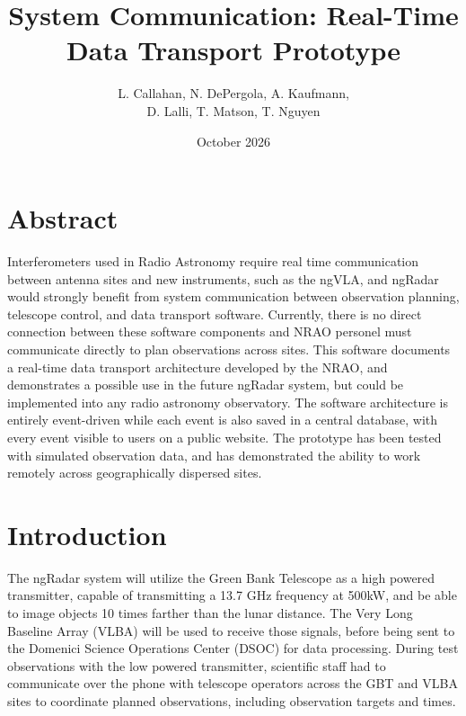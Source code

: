 \documentclass[12pt]{article}
\title{System Communication: Real-Time Data Transport Prototype}
\author{L. Callahan, N. DePergola, A. Kaufmann,\\D. Lalli, T. Matson, T. Nguyen}
\date{October 2026}
\begin{document}
\maketitle %


\section*{Abstract}

Interferometers used in Radio Astronomy require real time communication between antenna sites and new instruments, such as the ngVLA, and ngRadar would strongly benefit from system communication between observation planning, telescope control, and data transport software. Currently, there is no direct connection between these software components and NRAO personel must communicate directly to plan observations across sites.
This software documents a real-time data transport architecture developed by the NRAO, and demonstrates a possible use in the future ngRadar system, but could be implemented into any radio astronomy observatory. The software architecture is entirely event-driven while each event is also saved in a central database, with every event visible to users on a public website. The prototype has been tested with simulated observation data, and has demonstrated the ability to work remotely across geographically dispersed sites. 


\section{Introduction}

The ngRadar system will utilize the Green Bank Telescope as a high powered transmitter, capable of transmitting a 13.7 GHz frequency at 500kW, and be able to image objects 10 times farther than the lunar distance. The Very Long Baseline Array (VLBA) will be used to receive those signals, before being sent to the Domenici Science Operations Center (DSOC) for data processing. During test observations with the low powered transmitter, scientific staff had to communicate over the phone with telescope operators across the GBT and VLBA sites to coordinate planned observations, including observation targets and times.
\end{document}
